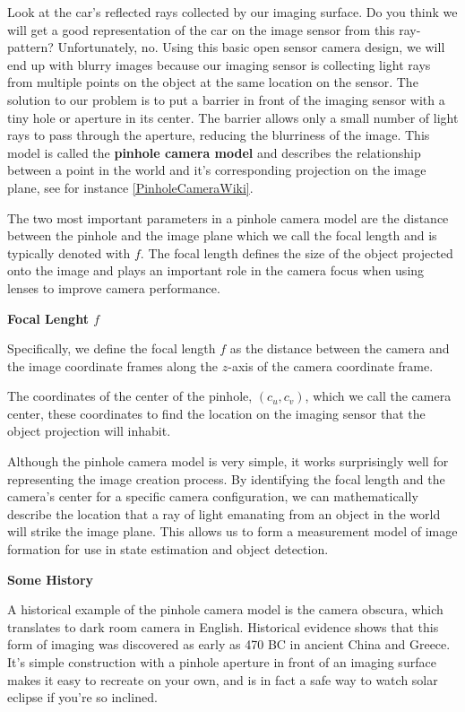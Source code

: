 Look at the car's reflected rays collected by our imaging surface. Do you think we will get
a good representation of the car on the image sensor
from this ray-pattern? Unfortunately, no. Using this basic open
sensor camera design, we will end up with blurry images because our imaging
sensor is collecting light rays from multiple points on the object at the same
location on the sensor. The solution to our problem is to put a barrier in front of the imaging sensor
with a tiny hole or aperture in its center. The barrier allows only a small number of light rays to pass
through the aperture, reducing the blurriness of the image. This model is called the \textbf{pinhole camera model} and describes the relationship between a point in
the world and it's corresponding projection on the image plane, see for instance \ref{PinholeCameraWiki}. 

The two most important parameters in a pinhole camera model are the distance between
the pinhole and the image plane which we call the focal length and is typically denoted with $f$. 
The focal length defines the size of the object projected
onto the image and plays an important role
in the camera focus when using lenses to improve camera performance. 

\begin{framed}
\begin{remark}{\textbf{Focal Lenght $f$}}

Specifically, we define the focal length $f$
as the distance between the camera and the
image coordinate frames along the $z$-axis of
the camera coordinate frame.
\end{remark}
\end{framed}


The coordinates of
the center of the pinhole, $(c_u, c_v)$, which we call the camera center, these coordinates to
find the location on the imaging sensor that the object projection will inhabit. 

Although the pinhole camera model is very simple, it works surprisingly well for representing the image
creation process. By identifying
the focal length and the camera's center for
a specific camera configuration, we can mathematically describe
the location that a ray of light emanating from an object in the world will strike
the image plane. This allows us to form a measurement model of image formation for use in state estimation
and object detection. 


\begin{framed}
\begin{remark}{\textbf{Some History}}

A historical example of the pinhole camera model
is the camera obscura, which translates to
dark room camera in English. Historical evidence shows that this form of imaging
was discovered as early as 470 BC in ancient
China and Greece. It's simple construction with a pinhole aperture in front of an imaging surface makes it
easy to recreate on your own, and is in fact a safe way to watch solar eclipse if
you're so inclined.
\end{remark}
\end{framed}


